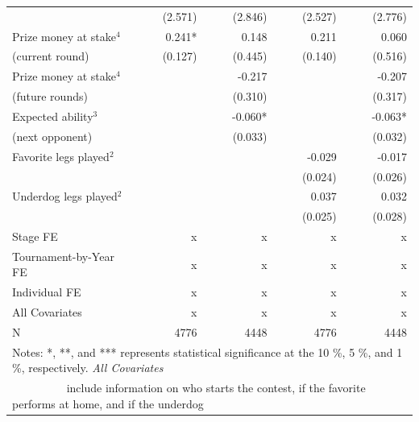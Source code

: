 \documentclass[11pt,a4paper]{article}
\begin{document}
\begin{table}[H]
\begin{tabular}{l r r r r r r r r }
			                               & &  (2.571)      & & (2.846)    & &  (2.527)   & &  (2.776)        \\
			Prize money at stake$^4$       & &  0.241*       & &  0.148     & &    0.211   & &  0.060          \\
			(current round)                & &  (0.127)      & &  (0.445)   & &  (0.140)   & &  (0.516)        \\
			Prize money at stake$^4$       & &               & &  -0.217    & &            & &  -0.207         \\
			(future rounds)                & &               & &   (0.310)  & &            & &  (0.317)        \\
			Expected ability$^3$           & &               & &  -0.060*   & &            & &   -0.063*       \\
			(next opponent)                & &               & &  (0.033)   & &            & &  (0.032)        \\
			Favorite legs played$^2$       & &               & &            & &  -0.029    & &  -0.017         \\
			                               & &               & &            & &   (0.024)  & &  (0.026)        \\
			Underdog legs played$^2$       & &               & &            & & 0.037      & &  0.032          \\
			                               & &               & &            & &  (0.025)   & &  (0.028)        \\
            \midrule
			Stage FE                       & &  x         & &  x         & &  x         & &  x      \\ 
            Tournament-by-Year FE          & &  x         & &  x         & &  x         & &  x      \\
			Individual FE                  & &  x         & &  x         & &  x         & &  x      \\
			All Covariates                 & &  x         & &  x         & &  x         & &  x      \\
			\midrule 
            N                              & &   4776     & &   4448     & &   4776     & &   4448  \\ 
			\bottomrule \bottomrule
			\multicolumn{9}{l}{\footnotesize Notes: *, **, and *** represents statistical significance at the 10 \%, 5 \%, and 1 \%, respectively. \textit{All Covariates}}\\
			\multicolumn{9}{l}{\footnotesize ~~~~~~~~~    include information on who starts the contest, if the favorite performs at home, and if the underdog}\\

\end{tabular}
\end{table}
\end{document}
